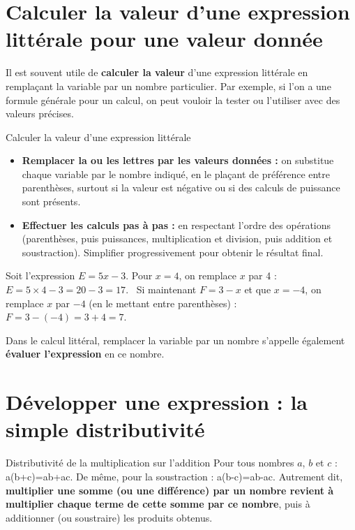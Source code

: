 \section{Calculer la valeur d'une expression littérale pour une valeur donnée}
Il est souvent utile de \textbf{calculer la valeur} d'une expression littérale en remplaçant la variable par un nombre particulier. Par exemple, si l'on a une formule générale pour un calcul, on peut vouloir la \og tester \fg{} ou l'utiliser avec des valeurs précises.

\begin{methode}{Calculer la valeur d'une expression littérale} \begin{itemize} 
\item \textbf{Remplacer la ou les lettres par les valeurs données :} on substitue chaque variable par le nombre indiqué, en le plaçant de préférence entre parenthèses, surtout si la valeur est négative ou si des calculs de puissance sont présents. 
\item \textbf{Effectuer les calculs pas à pas :} en respectant l'ordre des opérations (parenthèses, puis puissances, multiplication et division, puis addition et soustraction). Simplifier progressivement pour obtenir le résultat final. \end{itemize} 
\end{methode}

\begin{exemple} Soit l'expression $E = 5x - 3$. Pour $x = 4$, on remplace $x$ par 4 : $E = 5 \times 4 - 3 = 20 - 3 = 17$. \ Si maintenant $F = 3 - x$ et que $x = -4$, on remplace $x$ par $-4$ (en le mettant entre parenthèses) : $F = 3 - (-4) = 3 + 4 = 7$. \end{exemple}
Dans le calcul littéral, remplacer la variable par un nombre s'appelle également \textbf{évaluer l'expression} en ce nombre.


\section{Développer une expression : la simple distributivité}
\begin{propriete}{Distributivité de la multiplication sur l'addition} Pour tous nombres $a$, $b$ et $c$ :
a\times\left(b+c\right)=a\times b+a\times c.
De même, pour la soustraction :
a\times\left(b-c\right)=a\times b-a\times c.
Autrement dit, \textbf{multiplier une somme (ou une différence) par un nombre revient à multiplier chaque terme de cette somme par ce nombre}, puis à additionner (ou soustraire) les produits obtenus. 
\end{propriete}

